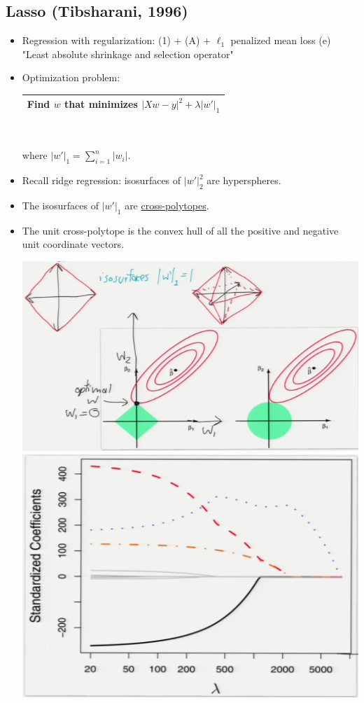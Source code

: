 \documentclass[10pt]{article}
\begin{document}
	\subsection*{Lasso (Tibsharani, 1996)}
	\begin{itemize}
		\item Regression with regularization: (1) + (A) + $\ell_{1}$ penalized mean loss (e) "Least absolute shrinkage and selection operator"
		\item Optimization problem:
		\begin{center}
			\begin{tabular}{|c|}
				\hline
				Find $w$ that minimizes $|Xw-y|^{2} + \lambda|w'|_{1}$\\
				\hline
			\end{tabular}\\
		\end{center}
		where $|w'|_{1} = \sum_{i=1}^{n}|w_{i}|$.
		\item Recall ridge regression: isosurfaces of $|w'|_{2}^{2}$ are hyperspheres. 
		\item The isosurfaces of $|w'|_{1}$ are \underline{cross-polytopes}.
		\item The unit cross-polytope is the convex hull of all the positive and negative unit coordinate vectors.
		\begin{center}
			\includegraphics[scale=0.6]{images/lassol1}
			\includegraphics[scale=0.6]{images/standarizesweights}
		\end{center}
		

\end{itemize}
\end{document}
